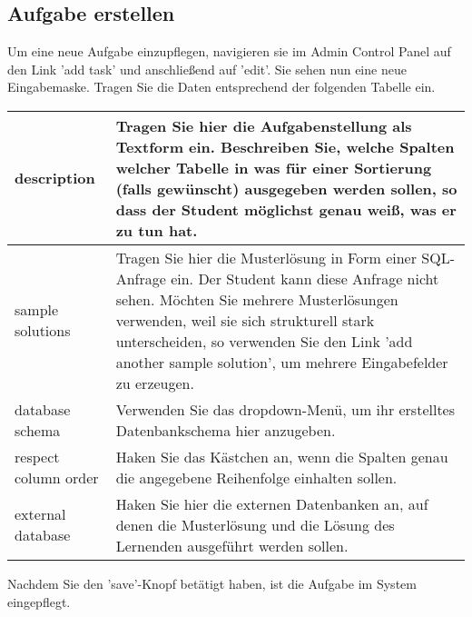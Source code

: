 \subsection{Aufgabe erstellen}

Um eine neue Aufgabe einzupflegen, navigieren sie im Admin Control Panel auf den Link 'add task' und anschließend auf 'edit'. Sie sehen nun eine neue Eingabemaske. Tragen Sie die Daten entsprechend der folgenden Tabelle ein.

\begin{tabular}{|l|p{12cm}|}\hline
description & Tragen Sie hier die Aufgabenstellung als Textform ein. Beschreiben Sie, welche Spalten welcher Tabelle in was für einer Sortierung (falls gewünscht) ausgegeben werden sollen, so dass der Student möglichst genau weiß, was er zu tun hat.\\\hline
sample solutions & Tragen Sie hier die Musterlösung in Form einer SQL-Anfrage ein. Der Student kann diese Anfrage nicht sehen. Möchten Sie mehrere Musterlösungen verwenden, weil sie sich strukturell stark unterscheiden, so verwenden Sie den Link 'add another sample solution', um mehrere Eingabefelder zu erzeugen.\\\hline
database schema & Verwenden Sie das dropdown-Menü, um ihr erstelltes Datenbankschema hier anzugeben.\\\hline
respect column order & Haken Sie das Kästchen an, wenn die Spalten genau die angegebene Reihenfolge einhalten sollen.\\\hline
external database & Haken Sie hier die externen Datenbanken an, auf denen die Musterlösung und die Lösung des Lernenden ausgeführt werden sollen.\\\hline
\end{tabular}

Nachdem Sie den 'save'-Knopf betätigt haben, ist die Aufgabe im System eingepflegt.